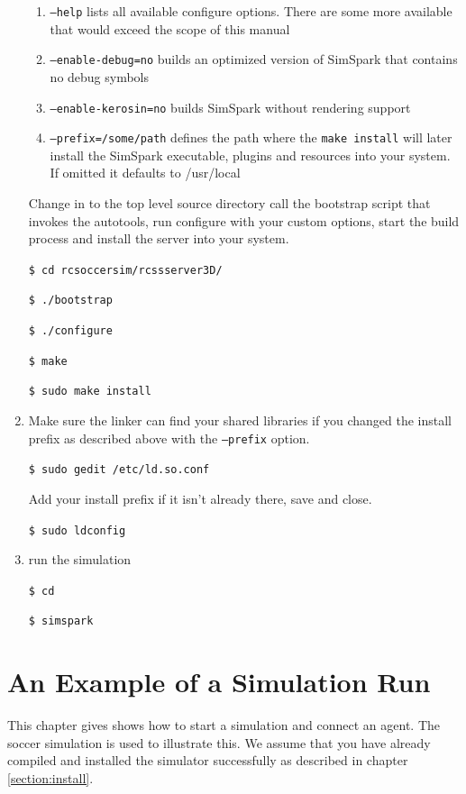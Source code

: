 \begin{enumerate}
\begin{enumerate}
\item \texttt{--help} lists all available configure options. There are some more available 
that would exceed the scope of this manual

\item \texttt{--enable-debug=no} builds an optimized version of SimSpark 
that contains no debug symbols

\item \texttt{--enable-kerosin=no} builds SimSpark without rendering support

\item \texttt{--prefix=/some/path} defines the path where the \texttt{make install} will later 
install the SimSpark executable, plugins and resources into your
system. If omitted it defaults to /usr/local

\end{enumerate}

Change in to the top level source directory call the bootstrap script
that invokes the autotools, run configure with your custom options,
start the build process and install the server into your system.

\texttt{\$ cd rcsoccersim/rcssserver3D/}

\texttt{\$ ./bootstrap}

\texttt{\$ ./configure}

\texttt{\$ make}

\texttt{\$ sudo make install}

\item Make sure the linker can find your shared libraries if you changed
the install prefix as described above with the \texttt{--prefix}
option.

\texttt{\$ sudo gedit /etc/ld.so.conf}

Add your install prefix if it isn't already there, save and close.

\texttt{\$ sudo ldconfig}

\item run the simulation

{\texttt{\$ cd}}

{\texttt{\$ simspark}}

\end{enumerate}

\section{An Example of a Simulation Run}

This chapter gives shows how to start a simulation and connect an
agent. The soccer simulation is used to illustrate this. We assume
that you have already compiled and installed the simulator successfully
as described in chapter \ref{section:install}. 

